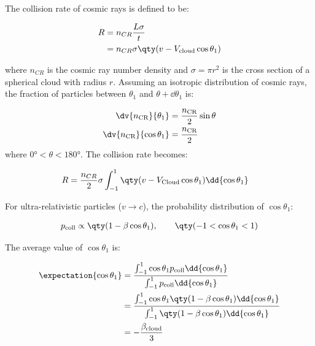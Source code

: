 \noindent The collision rate of cosmic rays is defined to be:

\begin{equation}
    \begin{aligned}
    R&=n_{CR}\frac{L\sigma}{t} \\
	&=n_{CR}\sigma\qty(v-V_\text{cloud}\cos\theta_1)
    \end{aligned}
\end{equation}

\noindent where $n_{CR}$ is the cosmic ray number density and $\sigma=\pi r^2$ is the cross section of a spherical cloud with radius $r$. Assuming an isotropic distribution of cosmic rays, the fraction of particles between $\theta_1$ and $\theta+\dd{\theta_1}$ is:

\begin{equation}
    \begin{aligned}
        \dv{n_\text{CR}}{\theta_1}&=\frac{n_\text{CR}}{2}\sin\theta \\
        \dv{n_\text{CR}}{\cos\theta_1}&=\frac{n_\text{CR}}{2}
    \end{aligned}
\end{equation}
\noindent where $\ang{0}<\theta<\ang{180}$. The collision rate becomes:
 
\begin{equation}
    \begin{aligned}
    R&=\frac{n_{CR}}{2}\sigma\int_{-1}^{1}\qty(v-V_\text{Cloud}\cos\theta_1)\dd{\cos\theta_1}
    \end{aligned}
\end{equation}


For ultra-relativistic particles ($v\rightarrow c$), the probability distribution of $\cos\theta_1$:

\begin{equation}
    \begin{aligned}
    p_\text{coll}\propto \qty(1-\beta\cos\theta_1),\qquad\qty(-1<\cos\theta_1<1)
    \end{aligned}
\end{equation}

The average value of $\cos\theta_1$ is:

\begin{equation}
    \begin{aligned}
    \expectation{\cos\theta_1}&=\frac{\int_{-1}^{1}\cos\theta_1p_\text{coll}\dd{\cos\theta_1}}{\int_{-1}^{1}p_\text{coll}\dd{\cos\theta_1}} \\
	&=\frac{\int_{-1}^{1}\cos\theta_1\qty(1-\beta\cos\theta_1)\dd{\cos\theta_1}}{\int_{-1}^{1}\qty(1-\beta\cos\theta_1)\dd{\cos\theta_1}} \\
	&=-\frac{\beta_\text{cloud}}{3} 
    \end{aligned} \label{eq:appendix_A_fermi_or_av_theta1}
\end{equation} 

